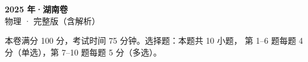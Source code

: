\documentclass[zihao=-4, a4paper]{ctexart}
\begin{document}
\begin{center}
  {\Large\bfseries 2025 年·湖南卷}\\[4pt]
  {\large 物理 · 完整版（含解析）}
\end{center}
\medskip
\begin{gknotice}
  本卷满分 100 分，考试时间 75 分钟。选择题：本题共 10 小题，
  第 1--6 题每题 4 分（单选），第 7--10 题每题 5 分（多选）。
\end{gknotice}

\clearpage
{}

\clearpage
{}

\end{document}
